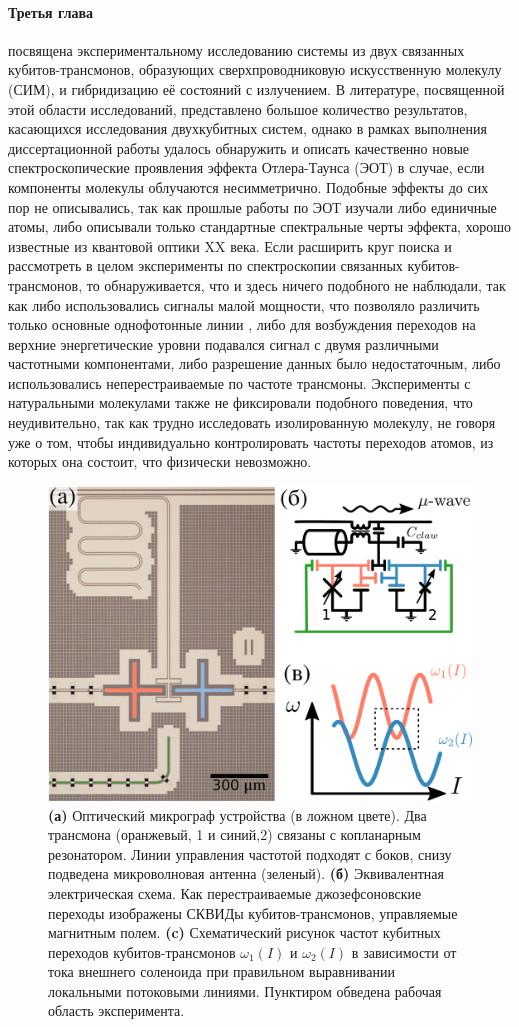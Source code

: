 \documentclass[14pt, a4paper]{extarticle}
\begin{document}
\paragraph{Третья глава} посвящена экспериментальному исследованию системы из двух связанных кубитов\hyp трансмонов, образующих сверхпроводниковую искусственную молекулу (СИМ), и гибридизацию её состояний с излучением. В литературе, посвященной этой области исследований, представлено большое количество результатов, касающихся исследования двухкубитных систем, однако в рамках выполнения диссертационной работы удалось обнаружить и описать качественно новые спектроскопические проявления эффекта Отлера-Таунса (ЭОТ) в случае, если компоненты молекулы облучаются несимметрично. Подобные эффекты до сих пор не описывались, так как прошлые работы по ЭОТ изучали либо единичные атомы, либо описывали только стандартные спектральные черты эффекта, хорошо известные из квантовой оптики XX века. Если расширить круг поиска и рассмотреть в целом эксперименты по спектроскопии связанных кубитов\hyp трансмонов, то обнаруживается, что и здесь ничего подобного не наблюдали, так как либо использовались сигналы малой мощности, что позволяло различить только основные однофотонные линии , либо для возбуждения переходов на верхние энергетические уровни подавался сигнал с двумя различными частотными компонентами, либо разрешение данных было недостаточным, либо использовались неперестраиваемые по частоте трансмоны. Эксперименты с натуральными молекулами также не фиксировали подобного поведения, что неудивительно, так как трудно исследовать изолированную молекулу, не говоря уже о том, чтобы индивидуально контролировать частоты переходов атомов, из которых она состоит, что физически невозможно.


\begin{figure}[t]
	\centering
	\includegraphics[width=0.7\linewidth]{Pictures/experiment_2}
	\caption{\textbf{(а)} Оптический микрограф устройства (в ложном цвете). Два трансмона (оранжевый, 1 и синий,2) связаны с  копланарным резонатором. Линии управления частотой подходят с боков, снизу подведена микроволновая антенна (зеленый). \textbf{(б)} Эквивалентная электрическая схема. Как перестраиваемые джозефсоновские переходы изображены СКВИДы кубитов\hyp трансмонов, управляемые магнитным полем. \textbf{(c)} Схематический рисунок частот кубитных переходов кубитов\hyp трансмонов $\omega_1 (I)$ и $\omega_2 (I)$ в зависимости от тока внешнего соленоида при правильном выравнивании локальными потоковыми линиями. Пунктиром обведена рабочая область эксперимента.}
	\label{fig:experiment2}
\end{figure}
\end{document}
